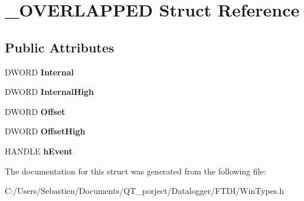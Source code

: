 \hypertarget{struct___o_v_e_r_l_a_p_p_e_d}{}\section{\+\_\+\+O\+V\+E\+R\+L\+A\+P\+P\+ED Struct Reference}
\label{struct___o_v_e_r_l_a_p_p_e_d}
\subsection*{Public Attributes}
\begin{DoxyCompactItemize}
\item 
\mbox{\label{struct___o_v_e_r_l_a_p_p_e_d_a2253d58d3120adff7f6d0242400bc7b4}} 
D\+W\+O\+RD {\bfseries Internal}
\item 
\mbox{\label{struct___o_v_e_r_l_a_p_p_e_d_a577d8d492b8872fb1840947e2d2b06a7}} 
D\+W\+O\+RD {\bfseries Internal\+High}
\item 
\mbox{\label{struct___o_v_e_r_l_a_p_p_e_d_a60b84fb65a45c8383a5274b38a3f4896}} 
D\+W\+O\+RD {\bfseries Offset}
\item 
\mbox{\label{struct___o_v_e_r_l_a_p_p_e_d_a07370c1d35023959e51450a8e91c5a32}} 
D\+W\+O\+RD {\bfseries Offset\+High}
\item 
\mbox{\label{struct___o_v_e_r_l_a_p_p_e_d_aa34d425458cd9ae57e8a8bf5aadc2923}} 
H\+A\+N\+D\+LE {\bfseries h\+Event}
\end{DoxyCompactItemize}


The documentation for this struct was generated from the following file\+:\begin{DoxyCompactItemize}
\item 
C\+:/\+Users/\+Sebastien/\+Documents/\+Q\+T\+\_\+porject/\+Datalogger/\+F\+T\+D\+I/Win\+Types.\+h\end{DoxyCompactItemize}
